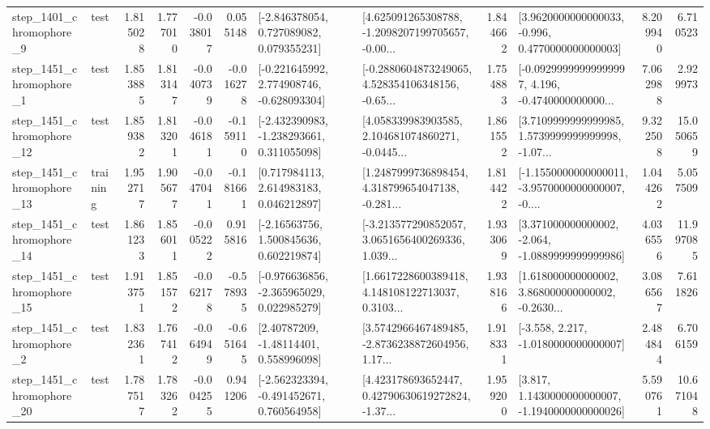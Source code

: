 \begin{tabular}{llrrrrllrlrr}
  step\_1401\_chromophore\_9 &      test &      1.815028 &    1.777010 &     -0.038017 &  0.055148 &    [-2.846378054, 0.727089082, 0.079355231] &  [4.625091265308788, -1.2098207199705657, -0.00... &       1.844662 &   [3.9620000000000033, -0.996, 0.4770000000000003] &            8.209940 &          6.710523 \\
  step\_1451\_chromophore\_1 &      test &      1.853885 &    1.813147 &     -0.040739 & -0.016278 &   [-0.221645992, 2.774908746, -0.628093304] &  [-0.2880604873249065, 4.528354106348156, -0.65... &       1.754883 &  [-0.09299999999999997, 4.196, -0.4740000000000... &            7.062988 &          2.929973 \\
 step\_1451\_chromophore\_12 &      test &      1.859382 &    1.813201 &     -0.046181 & -0.159110 &   [-2.432390983, -1.238293661, 0.311055098] &  [4.058339983903585, 2.104681074860271, -0.0445... &       1.861552 &  [3.7109999999999985, 1.5739999999999998, -1.07... &            9.322508 &         15.050659 \\
 step\_1451\_chromophore\_13 &  training &      1.952717 &    1.905677 &     -0.047041 & -0.181661 &     [0.717984113, 2.614983183, 0.046212897] &  [1.2487999736898454, 4.318799654047138, -0.281... &       1.814422 &  [-1.1550000000000011, -3.9570000000000007, -0.... &            1.044262 &          5.057509 \\
 step\_1451\_chromophore\_14 &      test &      1.861233 &    1.856011 &     -0.005222 &  0.915816 &     [-2.16563756, 1.500845636, 0.602219874] &  [-3.213577290852057, 3.0651656400269336, 1.039... &       1.933069 &   [3.371000000000002, -2.064, -1.0889999999999986] &            4.036556 &         11.997085 \\
 step\_1451\_chromophore\_15 &      test &      1.913751 &    1.851572 &     -0.062178 & -0.578935 &   [-0.976636856, -2.365965029, 0.022985279] &  [1.6617228600389418, 4.148108122713037, 0.3103... &       1.938166 &  [1.618000000000002, 3.868000000000002, -0.2630... &            3.086567 &          7.611826 \\
  step\_1451\_chromophore\_2 &      test &      1.832361 &    1.767412 &     -0.064949 & -0.651645 &      [2.40787209, -1.48114401, 0.558996098] &  [3.5742966467489485, -2.8736238872604956, 1.17... &       1.918331 &               [-3.558, 2.217, -1.0180000000000007] &            2.484844 &          6.706159 \\
 step\_1451\_chromophore\_20 &      test &      1.787517 &    1.783262 &     -0.004255 &  0.941206 &   [-2.562323394, -0.491452671, 0.760564958] &  [4.423178693652447, 0.42790630619272824, -1.37... &       1.959200 &   [3.817, 1.1430000000000007, -1.1940000000000026] &            5.590761 &         10.671048 \\

\end{tabular}
